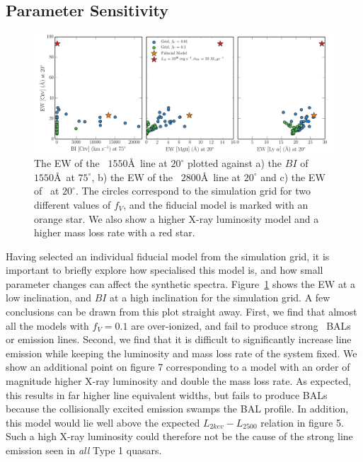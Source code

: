 \documentclass[useAMS,usenatbib]{mn2e_x}
\begin{document}
\subsection{Parameter Sensitivity}

\label{sec:param_sens}

\begin{figure}
\centering
\includegraphics[width=1.0\textwidth]{figures/scatter_c4_grid.png}
\caption
{
The EW of the \civ~$1550$\AA\ line at $20^\circ$ plotted against a) the 
$BI$ of \civ~$1550$\AA\ at $75^\circ$, b) the EW of the \mg~$2800$\AA\ line 
at $20^\circ$ and c) the EW of \la\ at $20^\circ$. The circles correspond 
to the simulation grid for two different values of $f_V$, and the fiducial 
model is marked with an orange star. 
We also show a higher X-ray luminosity model and a higher mass loss rate
with a red star.
}
\label{fig:grid}
\end{figure}

Having selected an individual fiducial model from the simulation grid, it is important
to briefly explore how specialised this model is, and how small parameter
changes can affect the synthetic spectra. Figure~\ref{fig:grid}
shows the EW at a low inclination, and $BI$ at a high inclination for the simulation
grid. A few conclusions can be drawn from this plot straight away. 
First, we find that almost all the models with $f_V=0.1$ are over-ionized, and 
fail to produce strong \civ\ BALs or emission lines. Second, we find that 
it is difficult to significantly increase line emission while
keeping the luminosity and mass loss rate of the system fixed. 
We show an additional point on figure 7 corresponding to a model with an order of
magnitude higher X-ray luminosity and double the mass loss rate. As expected, 
this results in far higher line equivalent widths, but fails to produce BALs because
the collisionally excited emission swamps the BAL profile. In addition,
this model would lie well above the expected $L_{2kev}-L_{2500}$ 
relation in figure 5. Such a high X-ray luminosity could therefore 
not be the cause of the strong line emission seen in {\em all} Type 1 quasars.
\end{document}
